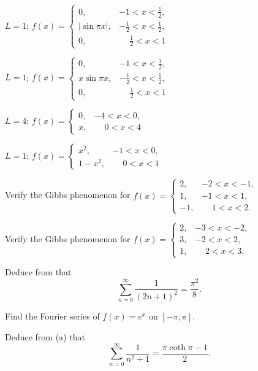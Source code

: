 \begin{exerciselist}
\item\label{exer:11.2.13}$L=1$;  \quad$f(x)=
\begin{cases}
0,&-1<x<\frac{1}{2},\\
|\sin\pi x|,&-\frac{1}{2}<x<\frac{1}{2},\\
0,&\phantom{-}\frac{1}{2}<x<1
\end{cases}$

\item\label{exer:11.2.14}$L=1$;  \quad$f(x)=
\begin{cases}
0,&-1<x<\frac{1}{2},\\
x\sin\pi x,&-\frac{1}{2}<x<\frac{1}{2},\\
0,&\phantom{-}\frac{1}{2}<x<1
\end{cases}$

\item\label{exer:11.2.15}\Cex
$L=4$;  \quad
$f(x)=
\begin{cases}
0,&-4<x<0,\\x,&\phantom{-}0<x<4
\end{cases}$

\item\label{exer:11.2.16}\Cex
$L=1$;  \quad $f(x)=
\begin{cases}
x^2,&-1< x<0,
\\1-x^2,&\phantom{-}0<x<1
\end{cases}$

\item\label{exer:11.2.17}\Lex Verify the Gibbs phenomenon for
\quad $f(x)=
\begin{cases}
2,&-2< x<-1,\\
1,&-1<x<1,\\
-1,&\phantom{-}1< x<2.
\end{cases}$

\item\label{exer:11.2.18}\Lex Verify the Gibbs phenomenon for
\quad $f(x)=
\begin{cases}
2,&-3< x<-2,\\
3,&-2<x<2,\\
1,&\phantom{-}2< x<3.
\end{cases}$

\item\label{exer:11.2.19}Deduce from  that
\[
\sum_{n=0}^\infty\frac{1}{(2n+1)^2}=\frac{\pi^2}{8}.
\]

\item\label{exer:11.2.20}\begin{alist}
\item %
Find the Fourier series of $f(x)=e^x$ on $[-\pi,\pi]$.
\item %
Deduce from  (a)  that
\[
\sum_{n=0}^\infty\frac{1}{n^2+1}=\frac{\pi\coth\pi-1}{2}.
\]
\end{alist}


\end{exerciselist}
